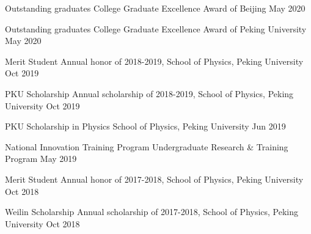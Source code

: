 




\begin{cvhonors}

\cvhonor
{Outstanding graduates} %
{College Graduate Excellence Award of Beijing} %
{} %
{May 2020} %

\cvhonor
{Outstanding graduates} %
{College Graduate Excellence Award of Peking University} %
{} %
{May 2020} %

\cvhonor
{Merit Student} %
{Annual honor of 2018-2019, School of Physics, Peking University} %
{} %
{Oct 2019} %


\cvhonor
{PKU Scholarship} %
{Annual scholarship of 2018-2019, School of Physics, Peking University} %
{} %
{Oct 2019} %

\cvhonor
{PKU Scholarship in Physics} %
{School of Physics, Peking University} %
{} %
{Jun 2019} %


\cvhonor
{National Innovation Training Program} %
{Undergraduate Research \& Training Program} %
{} %
{May 2019} %


\cvhonor
{Merit Student} %
{Annual honor of 2017-2018, School of Physics, Peking University} %
{} %
{Oct 2018} %


\cvhonor
{Weilin Scholarship} %
{Annual scholarship of 2017-2018, School of Physics, Peking University} %
{} %
{Oct 2018} %


\end{cvhonors}
